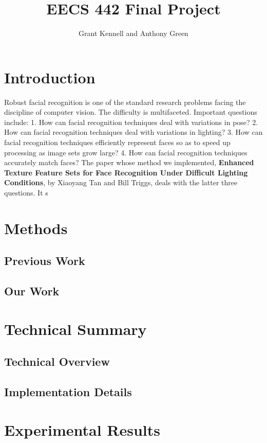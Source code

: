 \documentclass[11pt]{amsart}
\title{EECS 442 Final Project}
\author{Grant Kennell and Anthony Green}
\begin{document}
\maketitle
\section{Introduction}

Robust facial recognition is one of the standard research problems facing the discipline of computer vision. The difficulty is multifaceted. Important questions include:
1. How can facial recognition techniques deal with variations in pose?
2. How can facial recognition techniques deal with variations in lighting?
3. How can facial recognition techniques efficiently represent faces so as to speed up processing as image sets grow large?
4. How can facial recognition techniques accurately match faces?
The paper whose method we implemented, \textbf{Enhanced Texture Feature Sets for Face Recognition Under Difficult Lighting Conditions}, by Xiaoyang Tan and Bill Triggs, deals with the latter three questions. It s

\section{Methods}
\subsection{Previous Work}
\subsection{Our Work}
\section{Technical Summary}
\subsection{Technical Overview}
\subsection{Implementation Details}
\section{Experimental Results}
\end{document}
